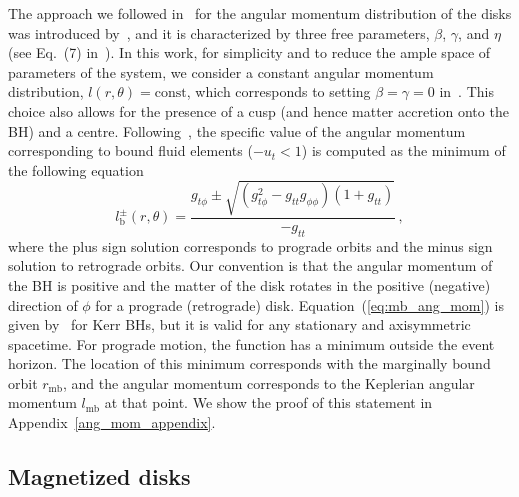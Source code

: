 \documentclass[twocolumn,aps,showpacs,showkeys,prd,superscriptaddress,byrevtex, amsmath]{revtex4-1}
\begin{document}
The approach we followed in~\cite{Gimeno-Soler:2017} for the angular momentum distribution of the disks was introduced by~\cite{Qian:2009}, and it is characterized by three free parameters, $\beta$, $\gamma$, and $\eta$ (see Eq.~(7) in~\cite{Gimeno-Soler:2017}). In this work, for simplicity and to reduce the ample space of parameters of the system, we consider a constant angular momentum distribution, $l(r,\theta) = \mathrm{const}$, which corresponds to setting $\beta=\gamma=0$ in~\cite{Gimeno-Soler:2017}. This choice also allows for the presence of a cusp (and hence matter accretion onto the BH) and a centre. Following~\citep{Daigne:2004}, the specific value of the angular momentum corresponding to bound fluid elements ($-u_t<1$) is computed as the minimum of the following equation
\begin{equation}\label{eq:mb_ang_mom}
l^{\pm}_{\mathrm{b}}(r, \theta) = \frac{g_{t\phi} \pm \sqrt{ (g_{t\phi}^2-g_{tt}g_{\phi\phi})  (1+g_{tt}) } }{-g_{tt}}\,,
\end{equation}
where the plus sign solution corresponds to prograde orbits and the minus sign solution to retrograde orbits. Our convention is that the angular momentum of the BH is positive and the matter of the disk rotates in the positive (negative) direction of $\phi$ for a prograde (retrograde) disk. Equation~(\ref{eq:mb_ang_mom}) is given by~\citep{Daigne:2004} for Kerr BHs, but it is valid for any stationary and axisymmetric spacetime. For prograde motion, the function has a minimum outside the event horizon. The location of this minimum corresponds with the marginally bound orbit $r_{\mathrm{mb}}$, and the angular momentum corresponds to the Keplerian angular momentum $l_{\mathrm{mb}}$ at that point. We show the proof of this statement in Appendix~\ref{ang_mom_appendix}.

\subsection{Magnetized disks}
\end{document}
